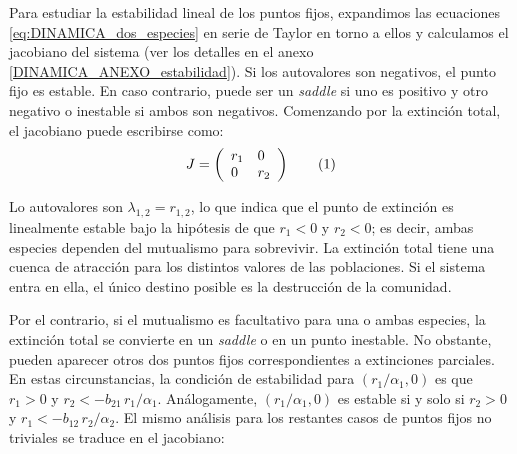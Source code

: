 Para estudiar la estabilidad lineal de los puntos fijos, expandimos las ecuaciones \ref{eq:DINAMICA_dos_especies} en serie de Taylor en torno a ellos y calculamos el jacobiano del sistema (ver los detalles en el anexo \ref{DINAMICA_ANEXO_estabilidad}). Si los autovalores son negativos, el punto fijo es estable. En caso contrario, puede ser un \textit{saddle} si uno es positivo y otro negativo o inestable si ambos son negativos. Comenzando por la extinción total, el jacobiano puede escribirse como: 
\begin{equation}
J = \left(
\begin{array}{ll}
r_{1}   & 0 \\
0 & r_{2} 
\end{array}
\right) \stepcounter{equation}\tag{\theequation}\label{eq:J00}
\end{equation}

Lo autovalores son $\lambda_{1,2} = r_{1,2}$, lo que indica que el punto de extinción es linealmente estable bajo la hipótesis de que $r_{1}<0$ y $r_{2}<0$; es decir, ambas especies dependen del mutualismo para sobrevivir. La extinción total tiene una cuenca de atracción para los distintos valores de las poblaciones. Si el sistema entra en ella, el único destino posible es la destrucción de la comunidad.

Por el contrario, si el mutualismo es facultativo para una o ambas especies, la extinción total se convierte en un \textit{saddle} o en un punto inestable. No obstante, pueden aparecer otros dos puntos fijos correspondientes a extinciones parciales. En estas circunstancias, la condición de estabilidad para $(r_1/\alpha_1, 0)$ es que $r_{1}>0$ y $r_{2}<-b_{21}\, r_{1}/\alpha_{1}$. Análogamente, $(r_1/\alpha_1, 0)$ es estable si y solo si  $r_{2}>0$ y $r_{1}<-b_{12}\, r_{2}/\alpha_{2}$.
El mismo análisis para los restantes casos de puntos fijos no triviales se traduce en el jacobiano:

